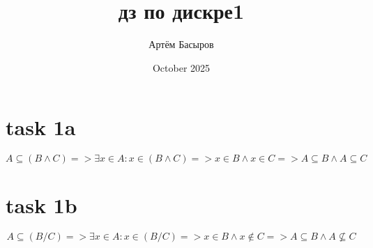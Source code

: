 \documentclass{article}
\title{дз по дискре1}
\author{Артём Басыров}
\date{October 2025}
\begin{document}
\section{task 1a}
$$
A\subseteq (B\land C) =>\exists x \in A : x\in (B \land C) => x\in B \land x\in C => A\subseteq B \land A\subseteq C
$$
\section{task 1b}
$$
A\subseteq (B/C) =>\exists x \in A :x\in (B / C) => x\in B \land x\notin C => A\subseteq B \land A\not\subseteq C
$$
\end{document}
